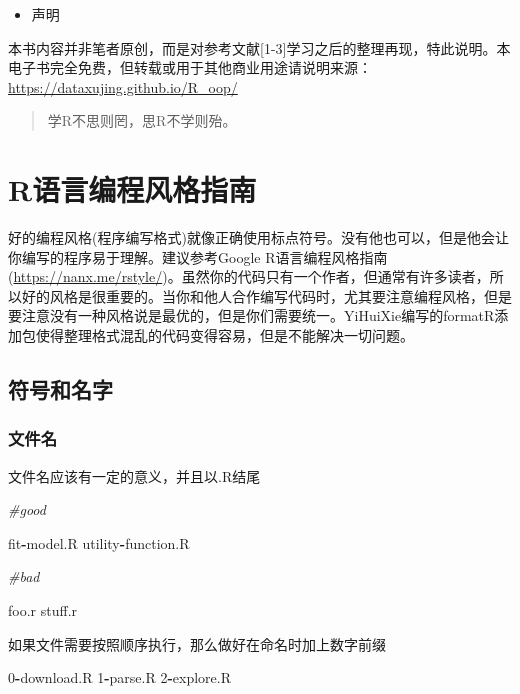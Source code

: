 \documentclass[]{book}
\newenvironment{Shaded}{\begin{snugshade}}{\end{snugshade}}
\newcommand{\DecValTok}[1]{\textcolor[rgb]{0.00,0.00,0.81}{#1}}
\newcommand{\CommentTok}[1]{\textcolor[rgb]{0.56,0.35,0.01}{\textit{#1}}}
\newcommand{\OperatorTok}[1]{\textcolor[rgb]{0.81,0.36,0.00}{\textbf{#1}}}
\newcommand{\NormalTok}[1]{#1}
\providecommand{\tightlist}{%
  \setlength{\itemsep}{0pt}\setlength{\parskip}{0pt}}
\begin{document}
\begin{itemize}
\tightlist
\item
  声明
\end{itemize}

本书内容并非笔者原创，而是对参考文献{[}1-3{]}学习之后的整理再现，特此说明。本电子书完全免费，但转载或用于其他商业用途请说明来源：\url{https://dataxujing.github.io/R_oop/}

\begin{quote}
学R不思则罔，思R不学则殆。
\end{quote}

\chapter{R语言编程风格指南}\label{ch1}

好的编程风格(程序编写格式)就像正确使用标点符号。没有他也可以，但是他会让你编写的程序易于理解。建议参考Google
R语言编程风格指南(\url{https://nanx.me/rstyle/})。虽然你的代码只有一个作者，但通常有许多读者，所以好的风格是很重要的。当你和他人合作编写代码时，尤其要注意编程风格，但是要注意没有一种风格说是最优的，但是你们需要统一。YiHuiXie编写的formatR添加包使得整理格式混乱的代码变得容易，但是不能解决一切问题。

\section{符号和名字}

\subsection{文件名}

文件名应该有一定的意义，并且以.R结尾

\begin{Shaded}
\begin{Highlighting}[]
\CommentTok{#good}

\NormalTok{fit}\OperatorTok{-}\NormalTok{model.R}
\NormalTok{utility}\OperatorTok{-}\NormalTok{function.R}

\CommentTok{#bad}

\NormalTok{foo.r}
\NormalTok{stuff.r}
\end{Highlighting}
\end{Shaded}

如果文件需要按照顺序执行，那么做好在命名时加上数字前缀

\begin{Shaded}
\begin{Highlighting}[]
\DecValTok{0}\OperatorTok{-}\NormalTok{download.R}
\DecValTok{1}\OperatorTok{-}\NormalTok{parse.R}
\DecValTok{2}\OperatorTok{-}\NormalTok{explore.R}
\end{Highlighting}
\end{Shaded}
\end{document}
